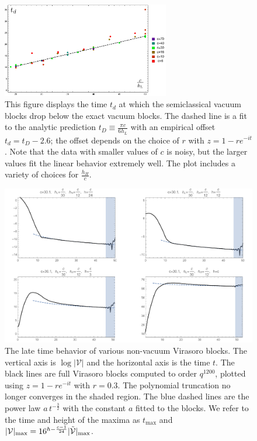 \documentclass[12pt]{article}
\numberwithin{equation}{section}
\newcommand{\CV}{{\cal V}}
\begin{document}
\begin{figure}[h]
\begin{centering}
\includegraphics[width=0.65\textwidth]{depTimePlot}
\caption{This figure displays the time $t_d$ at which the semiclassical vacuum blocks drop below the exact vacuum blocks.  The dashed line is a fit to the analytic prediction $t_D \equiv \frac{\pi c}{6 h_L}$ with an empirical offset $t_d = t_D -  2.6$; the offset depends on the choice of $r$ with $z = 1 - r e^{-it}$. Note that the data with smaller values of $c$ is noisy, but the larger values fit the linear behavior extremely well.  The plot includes a variety of choices for $\frac{h_H}{c}$. 
\label{fig:td}}
\par\end{centering}
\end{figure}

\begin{figure}[h]
\centering{}\includegraphics[scale=0.5]{NonVBlock}
\caption{The late time behavior of various non-vacuum Virasoro blocks. The vertical axis is $\log|\mathcal{V}|$ and the horizontal axis is the time $t$. The black lines are full Virasoro blocks computed to order $q^{1200}$, plotted using $z = 1 - r e^{-it}$ with $r=0.3$. The polynomial truncation no longer converges  in the shaded region. The blue dashed lines are the power law $a \, t^{-\frac{3}{2}}$ with the constant $a$ fitted to the blocks. We refer to the time and height  of the maxima as $t_{\max}$ and $|\CV|_{\max} = 16^{h - \frac{c-1}{24}} |\tilde \CV|_{\max}$.
\label{NonVBlock}}
\end{figure}
\end{document}
